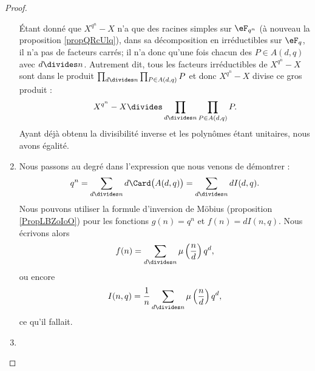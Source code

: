 \begin{proof}
\begin{enumerate}
            Étant donné que \( X^{q^n}-X\) n'a que des racines simples sur \( \eF_{q^n}\) (à nouveau la proposition \ref{propQRcUlq}), dans sa décomposition en irréductibles sur \( \eF_q\), il n'a pas de facteurs carrés; il n'a donc qu'une fois chacun des \( P\in A(d,q)\) avec \( d\divides n\). Autrement dit, tous les facteurs irréductibles de \( X^{q^n}-X\) sont dans le produit \( \prod_{d\divides n}\prod_{P\in A(d,q)}P\) et donc \( X^{q^n}-X\) divise ce gros produit :
            \begin{equation}
                X^{q^n}-X\divides \prod_{d\divides n}\prod_{P\in A(d,q)}P.
            \end{equation}
            Ayant déjà obtenu la divisibilité inverse et les polynômes étant unitaires, nous avons égalité.

        \item

            Nous passons au degré dans l'expression que nous venons de démontrer :
            \begin{equation}
                q^n=\sum_{d\divides n}d\Card\big( A(d,q) \big)=\sum_{d\divides n}dI(d,q).
            \end{equation}
            Nous pouvons utiliser la formule d'inversion de Möbius (proposition \ref{PropLBZoIoO}) pour les fonctions \( g(n)=q^n\) et \( f(n)=dI(n,q)\). Nous écrivons alors
            \begin{equation}
                f(n)=\sum_{d\divides n}\mu\left( \frac{ n }{ d } \right)q^d,
            \end{equation}
            ou encore 
            \begin{equation}
                I(n,q)=\frac{1}{ n }\sum_{d\divides n}\mu\left( \frac{ n }{ d } \right)q^d,
            \end{equation}
            ce qu'il fallait.

        \item


\end{enumerate}
\end{proof}
